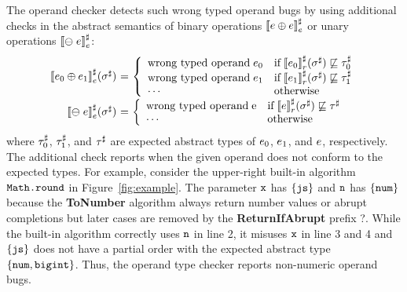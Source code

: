 The operand checker detects such wrong typed operand bugs by using additional
checks in the abstract semantics of binary operations ${\llbracket{e\oplus e}\rrbracket}^\sharp_e$
or unary operations ${\llbracket{\ominus\; e}\rrbracket}^\sharp_e$:
\[
  \begin{array}{r@{~}c@{~}l}
    \aseme{\expr_0 \bop \expr_1}(\aenv) &=& \left\{
      \begin{array}{ll}
        \text{wrong typed operand} \; \expr_0
        & \text{if} \; \asemr{\expr_0}(\aenv) \norder \aty_0\\
        \text{wrong typed operand} \; \expr_1
        & \text{if} \; \asemr{\expr_1}(\aenv) \norder \aty_1\\
        \cdots
        & \text{otherwise}\\
      \end{array}
    \right.\\

    \aseme{\uop \; \expr}(\aenv) &=& \left\{
      \begin{array}{ll}
        \text{wrong typed operand} \; $\expr$
        & \text{if} \; \asemr{\expr}(\aenv) \norder \aty\\
        \cdots
        & \text{otherwise}\\
      \end{array}
    \right.\\
  \end{array}
\]
where $\tau^\sharp_0$, $\tau^\sharp_1$, and $\tau^\sharp$ are expected abstract types of $e_0$,
$e_1$, and $e$, respectively.  The additional check reports when the
given operand does not conform to the expected types.  For example, consider the
upper-right built-in algorithm $\texttt{Math.round}$ in Figure~\ref{fig:example}.
The parameter $\texttt{x}$ has $\{ \texttt{js} \}$ and $\texttt{n}$ has $\{ \texttt{num} \}$ because the
\textbf{ToNumber} algorithm always return number values or abrupt completions
but later cases are removed by the \textbf{ReturnIfAbrupt} prefix ?.  While the
built-in algorithm correctly uses $\texttt{n}$ in line 2, it misuses $\texttt{x}$ in line 3 and
4 and $\{ \texttt{js} \}$ does not have a partial order with the expected abstract type
$\{ \texttt{num}, \texttt{bigint} \}$.  Thus, the operand type checker reports non-numeric
operand bugs.
